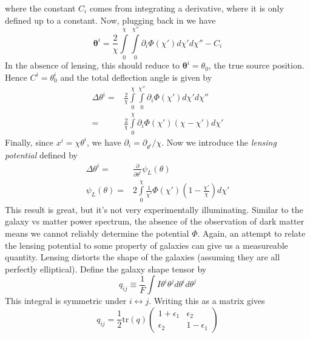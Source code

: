 where the constant $C_i$ comes from integrating a derivative, where it is only defined up to a constant. Now, plugging back in we have
\begin{equation}
	\mathbf{\theta}^i = \frac{2}{\chi}\int\limits_0^\chi \int\limits_0^{\chi''}\partial_i\Phi(\chi') d\chi' d\chi'' - C_i
\end{equation}
In the absence of lensing, this should reduce to $\mathbf{\theta}^i = \theta_0$, the true source position. Hence $C^i=\theta^i_0$ and the total deflection angle is given by
\begin{equation}
	\begin{split}
		\Delta\theta^i =& \frac{2}{\chi}\int\limits_0^\chi \int\limits_0^{\chi''}\partial_i\Phi(\chi') d\chi' d\chi''\\
		=& \frac{2}{\chi}\int\limits_0^\chi \partial_i\Phi(\chi') (\chi-\chi') d\chi'
	\end{split}
\end{equation}
Finally, since $x^i=\chi\theta^i$, we have $\partial_i = \partial_{\theta^i}/\chi$. Now we introduce the \textit{lensing potential} defined by
\begin{equation}
	\begin{split}
		\Delta\theta^i =& \frac{\partial}{\partial \theta^i}\psi_L(\theta) \\
		\psi_L(\theta) =& 2\int\limits_0^\chi \frac{1}{\chi'}\Phi(\chi') \left(1-\frac{\chi'}{\chi}\right) d\chi'
	\end{split}
\end{equation}
This result is great, but it's not very experimentally illuminating. Similar to the galaxy vs matter power spectrum, the absence of the observation of dark matter means we cannot reliably determine the potential $\Phi$. Again, an attempt to relate the lensing potential to some property of galaxies can give us a measureable quantity. Lensing distorts the shape of the galaxies (assuming they are all perfectly elliptical). Define the galaxy shape tensor by
\begin{equation}
	q_{ij} \equiv \frac{1}{F}\int I\theta^i\theta^j d\theta^i d\theta^j
\end{equation}
This integral is symmetric under $i \leftrightarrow j$. Writing this as a matrix gives
\begin{equation}
	q_{ij} = \frac{1}{2} \text{tr}(q) \left( 
	\begin{array}{cc}
	1+\epsilon_1 & \epsilon_2 \\
	\epsilon_2 & 1-\epsilon_1
	\end{array}
	\right)
\end{equation}
